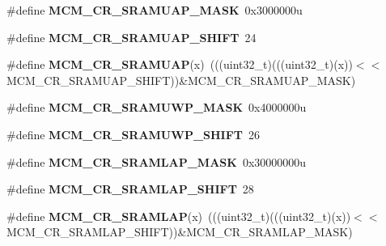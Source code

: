 \begin{DoxyCompactItemize}
\item 
\#define {\bfseries M\+C\+M\+\_\+\+C\+R\+\_\+\+S\+R\+A\+M\+U\+A\+P\+\_\+\+M\+A\+SK}~0x3000000u\hypertarget{group__MCM__Register__Masks_ga39213f9a00cf1862ab3e77c839e71c78}{}\label{group__MCM__Register__Masks_ga39213f9a00cf1862ab3e77c839e71c78}

\item 
\#define {\bfseries M\+C\+M\+\_\+\+C\+R\+\_\+\+S\+R\+A\+M\+U\+A\+P\+\_\+\+S\+H\+I\+FT}~24\hypertarget{group__MCM__Register__Masks_ga4608d3fb1b05eb0d37515c4686f6190c}{}\label{group__MCM__Register__Masks_ga4608d3fb1b05eb0d37515c4686f6190c}

\item 
\#define {\bfseries M\+C\+M\+\_\+\+C\+R\+\_\+\+S\+R\+A\+M\+U\+AP}(x)~(((uint32\+\_\+t)(((uint32\+\_\+t)(x))$<$$<$M\+C\+M\+\_\+\+C\+R\+\_\+\+S\+R\+A\+M\+U\+A\+P\+\_\+\+S\+H\+I\+FT))\&M\+C\+M\+\_\+\+C\+R\+\_\+\+S\+R\+A\+M\+U\+A\+P\+\_\+\+M\+A\+SK)\hypertarget{group__MCM__Register__Masks_gab9b0e14b6d8b8eb48c993e37da8fd709}{}\label{group__MCM__Register__Masks_gab9b0e14b6d8b8eb48c993e37da8fd709}

\item 
\#define {\bfseries M\+C\+M\+\_\+\+C\+R\+\_\+\+S\+R\+A\+M\+U\+W\+P\+\_\+\+M\+A\+SK}~0x4000000u\hypertarget{group__MCM__Register__Masks_ga80116d649929d7c9ad773cebd4e4c3bb}{}\label{group__MCM__Register__Masks_ga80116d649929d7c9ad773cebd4e4c3bb}

\item 
\#define {\bfseries M\+C\+M\+\_\+\+C\+R\+\_\+\+S\+R\+A\+M\+U\+W\+P\+\_\+\+S\+H\+I\+FT}~26\hypertarget{group__MCM__Register__Masks_ga73c2b0e8ecdcd2a07070c863db3e9fcd}{}\label{group__MCM__Register__Masks_ga73c2b0e8ecdcd2a07070c863db3e9fcd}

\item 
\#define {\bfseries M\+C\+M\+\_\+\+C\+R\+\_\+\+S\+R\+A\+M\+L\+A\+P\+\_\+\+M\+A\+SK}~0x30000000u\hypertarget{group__MCM__Register__Masks_gad9a5f5487e03cefac1a4798ccce630bc}{}\label{group__MCM__Register__Masks_gad9a5f5487e03cefac1a4798ccce630bc}

\item 
\#define {\bfseries M\+C\+M\+\_\+\+C\+R\+\_\+\+S\+R\+A\+M\+L\+A\+P\+\_\+\+S\+H\+I\+FT}~28\hypertarget{group__MCM__Register__Masks_ga083d0b4e4188e656d92bfa8fb9b4eca9}{}\label{group__MCM__Register__Masks_ga083d0b4e4188e656d92bfa8fb9b4eca9}

\item 
\#define {\bfseries M\+C\+M\+\_\+\+C\+R\+\_\+\+S\+R\+A\+M\+L\+AP}(x)~(((uint32\+\_\+t)(((uint32\+\_\+t)(x))$<$$<$M\+C\+M\+\_\+\+C\+R\+\_\+\+S\+R\+A\+M\+L\+A\+P\+\_\+\+S\+H\+I\+FT))\&M\+C\+M\+\_\+\+C\+R\+\_\+\+S\+R\+A\+M\+L\+A\+P\+\_\+\+M\+A\+SK)\hypertarget{group__MCM__Register__Masks_ga016e1c55cc89e6f0db47095d5c710f06}{}\label{group__MCM__Register__Masks_ga016e1c55cc89e6f0db47095d5c710f06}


\end{DoxyCompactItemize}
